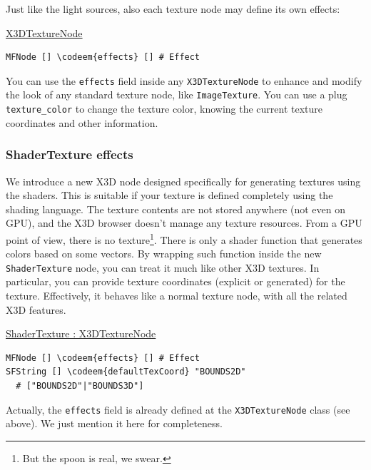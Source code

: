 \documentclass{acmsiggraph}                     %
\newenvironment{mycode}
{\begin{mycodecore}}
{\end{mycodecore}
\vspace{-0.1in}}
\newcommand*{\codeem}[1]{\textbf{#1}}
\begin{document}
Just like the light sources, also each texture node may define its own effects:

\begin{mycode}
\underline{X3DTextureNode}
\begin{Verbatim}[commandchars=\\\{\}]
MFNode [] \codeem{effects} [] # Effect
\end{Verbatim}
\end{mycode}

You can use the \texttt{effects} field
inside any \texttt{X3DTextureNode} to enhance and modify the look of any
standard texture node, like \texttt{ImageTexture}.
You can use a plug \texttt{texture\_color} to change the texture color,
knowing the current texture coordinates and other information.

\subsubsection{ShaderTexture effects}

We introduce a new X3D node designed specifically for generating
textures using the shaders. This is suitable
if your texture is defined completely using the shading language.
The texture contents are not stored anywhere (not even on GPU),
and the X3D browser doesn't manage any texture resources.
From a GPU point of view, there is no texture\footnote{But the spoon is real,
we swear.}. There is only a shader function that generates colors
based on some vectors. By wrapping such function inside
the new \texttt{ShaderTexture} node, you can treat it much like other X3D textures.
In particular, you can provide texture coordinates (explicit or generated)
for the texture.
Effectively, it behaves like a normal texture node, with all the related
X3D features.


\begin{mycode}
\underline{ShaderTexture : X3DTextureNode}
\begin{Verbatim}[commandchars=\\\{\}]
MFNode [] \codeem{effects} [] # Effect
SFString [] \codeem{defaultTexCoord} "BOUNDS2D"
  # ["BOUNDS2D"|"BOUNDS3D"]
\end{Verbatim}
\end{mycode}

Actually, the \texttt{effects} field is already defined at
the \texttt{X3DTextureNode} class (see above). We just mention it here
for completeness.
\end{document}
